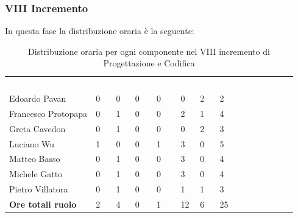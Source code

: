 \subsubsection{VIII Incremento}
In questa fase la distribuzione oraria è la seguente:
\begin{table}[H]
\begin{center}
\renewcommand{\arraystretch}{1.25}
\begin{tabular}{ m{}<{\centering}  m{}<{\centering} m{}<{\centering} m{}<{\centering}  m{}<{\centering}  m{}<{\centering}  m{}<{\centering}  m{}<{\centering}   }
	\rowcolor{darkblue}
	\textcolor{white}{\textbf{Componente}} &\textcolor{white}{\textbf{Re}}&\textcolor{white}{\textbf{Pt}}&\textcolor{white}{\textbf{An}}&\textcolor{white}{\textbf{Am}}&\textcolor{white}{\textbf{Pr}}&\textcolor{white}{\textbf{Ve}}&\textcolor{white}{\textbf{Ore complessive}}\\ 
	Edoardo Pavan & 0 & 0 & 0 & 0 & 0 & 2 & 2 \\	
	
	Francesco Protopapa & 0 & 1 & 0 & 0 & 2 & 1 & 4 \\

	Greta Cavedon & 0 & 1 & 0 & 0 & 0 & 2 & 3 \\
	
	Luciano Wu & 1 & 0 & 0 & 1 & 3 & 0 & 5 \\
	
	Matteo Basso & 0 & 1 & 0 & 0 & 3 & 0 & 4 \\
	
	Michele Gatto & 0 & 1 & 0 & 0 & 3 & 0 & 4 \\
	
	Pietro Villatora & 0 & 1 & 0 & 0 & 1 & 1 & 3 \\
	
	\textbf{Ore totali ruolo} & 2 & 4 & 0 & 1 & 12 & 6 & 25 \\

\end{tabular}
\caption{Distribuzione oraria per ogni componente nel VIII incremento di Progettazione e Codifica}
\end{center}
\end{table}

